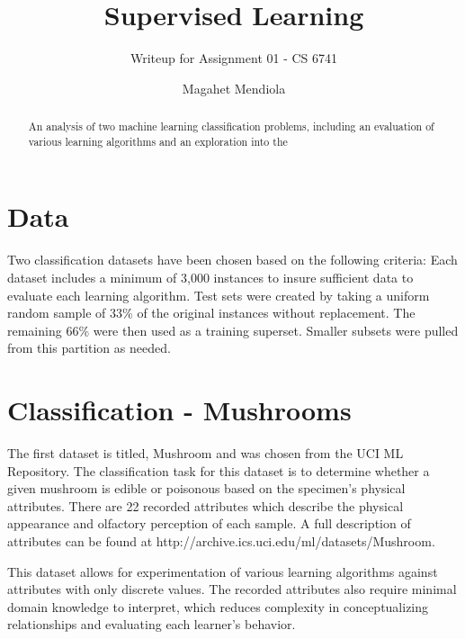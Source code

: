 \documentclass{sig-alternate}
\begin{document}
\title{Supervised Learning}
\subtitle{Writeup for Assignment 01 - CS 6741}

\author{
\alignauthor
Magahet Mendiola
}
\date{}

\maketitle
\begin{abstract}
An analysis of two machine learning classification problems, including an evaluation of various learning algorithms and an exploration into the 
\end{abstract}
 


\section{Data}

Two classification datasets have been chosen based on the following criteria: Each dataset includes a minimum of 3,000 instances to insure sufficient data to evaluate each learning algorithm. Test sets were created by taking a uniform random sample of 33\% of the original instances without replacement. The remaining 66\% were then used as a training superset. Smaller subsets were pulled from this partition as needed.


\section{Classification - Mushrooms}

The first dataset is titled, Mushroom \cite{Bache+Lichman:2013} and was chosen from the UCI ML Repository. The classification task for this dataset is to determine whether a given mushroom is edible or poisonous based on the specimen's physical attributes. There are 22 recorded attributes which describe the physical appearance and olfactory perception of each sample. A full description of attributes can be found at http://archive.ics.uci.edu/ml/datasets/Mushroom.

This dataset allows for experimentation of various learning algorithms against attributes with only discrete values. The recorded attributes also require minimal domain knowledge to interpret, which reduces complexity in conceptualizing relationships and evaluating each learner's behavior.
\end{document}
